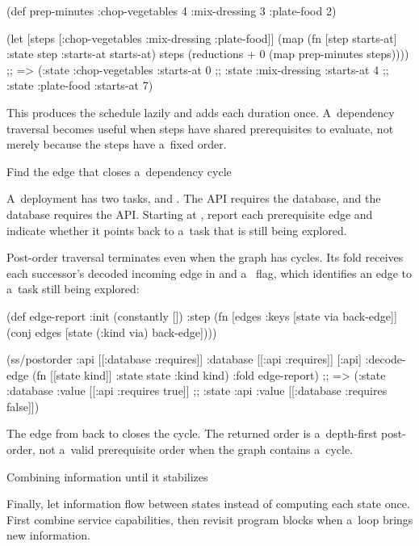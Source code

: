 {{{\begtt {}
(def prep-minutes
  {:chop-vegetables 4
   :mix-dressing 3
   :plate-food 2})

(let [steps [:chop-vegetables :mix-dressing :plate-food]]
  (map (fn [step starts-at]
         {:state step :starts-at starts-at})
       steps
       (reductions + 0 (map prep-minutes steps))))
;; => ({:state :chop-vegetables :starts-at 0}
;;     {:state :mix-dressing :starts-at 4}
;;     {:state :plate-food :starts-at 7})
\endtt

This produces the schedule lazily and adds each duration once. A~dependency
traversal becomes useful when steps have shared prerequisites to evaluate,
not merely because the steps have a~fixed order.

\secc Find the edge that closes a~dependency cycle

 A~deployment has two tasks,  and
. The API requires the database, and the database requires
the API. Starting at , report each prerequisite edge and indicate
whether it points back to a~task that is still being explored.

\smallskip
{} Post-order traversal terminates even when the
graph has cycles. Its fold receives each successor's
decoded incoming edge in  and a~ flag, which identifies an
edge to a~task still being explored:

\begtt {}
(def edge-report
  {:init (constantly [])
   :step (fn [edges {:keys [state via back-edge]}]
           (conj edges [state (:kind via) back-edge]))})

(ss/postorder {:api [[:database :requires]]
               :database [[:api :requires]]}
              [:api]
              {:decode-edge (fn [[state kind]]
                              {:state state :kind kind})
               :fold edge-report})
;; => ({:state :database :value [[:api :requires true]]}
;;     {:state :api :value [[:database :requires false]]})
\endtt

The edge from  back to  closes the cycle. The
returned order is a~depth-first post-order, not a~valid prerequisite order
when the graph contains a~cycle.

\sec Combining information until it stabilizes

Finally, let information flow between states instead of computing each
state once. First combine service capabilities, then revisit program blocks
when a~loop brings new information.

}}}
